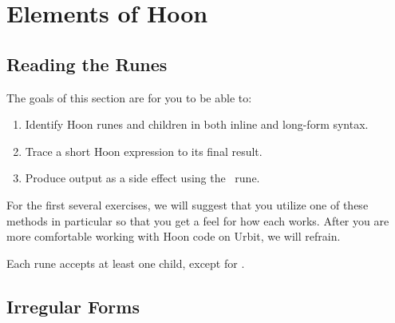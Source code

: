 \setchapterpreamble[u]{\margintoc}
\chapter{Elements of Hoon}


\section{Reading the Runes}

The goals of this section are for you to be able to:

\begin{enumerate}
  \item  Identify Hoon runes and children in both inline and long-form syntax.
  \item  Trace a short Hoon expression to its final result.
  \item  Produce output as a side effect using the \sigpam~rune.
\end{enumerate}


For the first several exercises, we will suggest that you utilize one of these methods in particular so that you get a feel for how each works.  After you are more comfortable working with Hoon code on Urbit, we will refrain.



Each rune accepts at least one child, except for \pzapzap.

\section{Irregular Forms}

